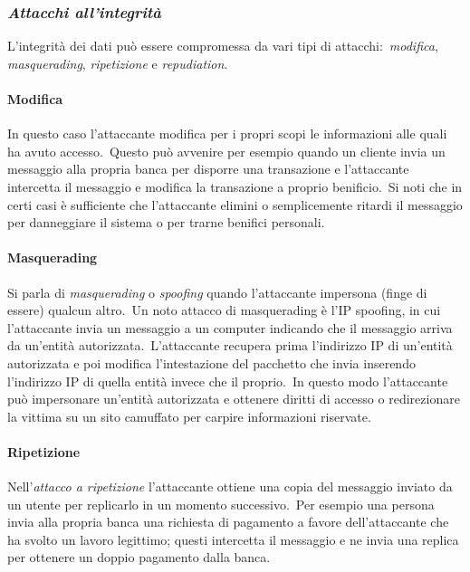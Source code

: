 \subsubsection{\textit{Attacchi all'integrità}}

L'integrità dei dati può essere compromessa da vari tipi di attacchi:\ \textit{modifica}, \textit{masquerading}, \textit{ripetizione} e \textit{repudiation}.

\paragraph{Modifica} In questo caso l'attaccante modifica per i propri scopi le informazioni alle quali ha avuto accesso.\
Questo può avvenire per esempio quando un cliente invia un messaggio alla propria banca per disporre una transazione e l'attaccante intercetta il messaggio e modifica la transazione a proprio benificio.\
Si noti che in certi casi è sufficiente che l'attaccante elimini o semplicemente ritardi il messaggio per danneggiare il sistema o per trarne benifici personali.

\paragraph{Masquerading}

Si parla di \textit{masquerading} o \textit{spoofing} quando l'attaccante impersona (finge di essere) qualcun altro.\
Un noto attacco di masquerading è l'IP spoofing, in cui l'attaccante invia un messaggio a un computer indicando che il messaggio arriva da un'entità autorizzata.\
L'attaccante recupera prima l'indirizzo IP di un'entità autorizzata e poi modifica l'intestazione del pacchetto che invia inserendo l'indirizzo IP di quella entità invece che il proprio.\
In questo modo l'attaccante può impersonare un'entità autorizzata e ottenere diritti di accesso o redirezionare la vittima su un sito camuffato per carpire informazioni riservate.

\paragraph{Ripetizione} Nell'\textit{attacco a ripetizione} l'attaccante ottiene una copia del messaggio inviato da un utente per replicarlo in un momento successivo.\
Per esempio una persona invia alla propria banca una richiesta di pagamento a favore dell'attaccante che ha svolto un lavoro legittimo; questi intercetta il messaggio e ne invia una replica per ottenere un doppio pagamento dalla banca.

